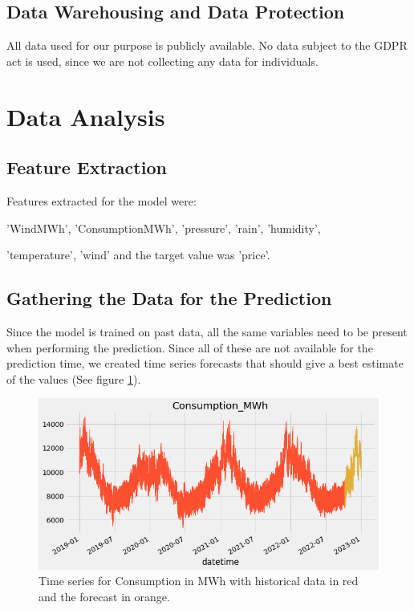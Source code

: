\documentclass{article}
\begin{document}
\subsection{Data Warehousing and Data Protection}
\label{subsection:warehousing}

All data used for our purpose is publicly available. No data subject to the GDPR act is used, since we are not collecting any data for individuals.

\section{Data Analysis}
\label{section:analysis}

\subsection{Feature Extraction}
\label{subsection:extraction}

Features extracted for the model were:

'WindMWh', 'ConsumptionMWh', 'pressure', 'rain', 'humidity',

'temperature', 'wind' and the target value was 'price'.


\subsection{Gathering the Data for the Prediction}
\label{subsection:datafilling}

Since the model is trained on past data, all the same variables need to be present when performing the prediction. Since all of these are not available for the prediction time, we created time series forecasts that should give a best estimate of the values (See figure \ref{fig:consumption}).

\begin{figure}
    \centering
    \includegraphics[width=15cm]{report/images/consumption.png}
    \caption{Time series for Consumption in MWh with historical data in red and the forecast in orange.}
    \label{fig:consumption}
\end{figure}
\end{document}
